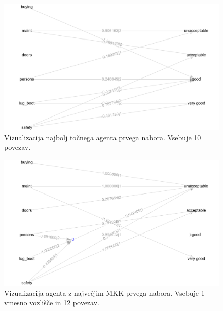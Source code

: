 \begin{figure}[H]
    \begin{center}
        \includegraphics[width=13cm]{car/1/acc_g}
    \end{center}
    \caption{Vizualizacija najbolj točnega agenta prvega nabora. Vsebuje 10 povezav.}
    \label{fig:car_acc_1_g}
\end{figure}

\begin{figure}[H]
    \begin{center}
        \includegraphics[width=13cm]{car/1/mcc_g}
    \end{center}
    \caption{Vizualizacija agenta z največjim MKK prvega nabora. Vsebuje 1 vmesno vozlišče in 12 povezav.}
    \label{fig:car_mcc_1_g}
\end{figure}


